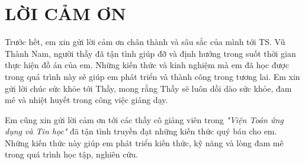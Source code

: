 \chapter*{\centering LỜI CẢM ƠN}


Trước hết, em xin gửi lời cảm ơn chân thành và sâu sắc của mình tới TS. Vũ Thành Nam, người thầy đã tận tình giúp đỡ và định hướng trong suốt thời gian thực hiện đồ án của em. Những kiến thức và kinh nghiệm mà em đã học được trong quá trình này sẽ giúp em phát triển và thành công trong tương lai. Em xin gửi lời chúc sức khỏe tới Thầy, mong rằng Thầy sẽ luôn dồi dào sức khỏe, đam mê và nhiệt huyết trong công việc giảng dạy.

Em cũng xin gửi lời cảm ơn tới các thầy cô giảng viên trong \textit{"Viện Toán ứng dụng và Tin học"} đã tận tình truyền đạt những kiến thức quý báu cho em. Những kiến thức này giúp em phát triển kiến thức, kỹ năng và lòng đam mê trong quá trình học tập, nghiên cứu.











